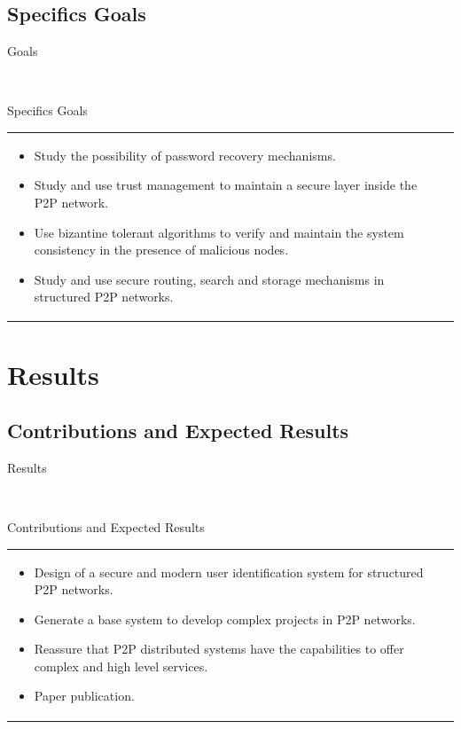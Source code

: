 \documentclass[12pt]{beamer}
\renewcommand{\frametitle}[1]{\vspace{0.2cm}\begin{huge}#1\end{huge}}
\renewcommand{\framesubtitle}[1]{\\ \vspace{0.4cm} \hspace{0.4cm}\begin{large}#1\end{large}}
\begin{document}
  \subsection{Specifics Goals}
    \begin{frame}
    \frametitle{Goals}
    \framesubtitle{Specifics Goals}
    \begin{table}
    \begin{tabular}{p{7cm}p{3cm}}
    \begin{itemize}
      \item Study the possibility of password recovery mechanisms.
      \item Study and use trust management to maintain a
            secure layer inside the P2P network.
      \item Use bizantine tolerant algorithms to verify and maintain the
            system consistency in the presence of malicious nodes.
      \item Study and use secure routing, search and storage mechanisms in
            structured P2P networks.
    \end{itemize}
    &
    \vspace{1.5cm}
    \end{tabular}
    \end{table}
    \end{frame}
  \section{Results}
  \subsection{Contributions and Expected Results}
    \begin{frame}
    \frametitle{Results}
    \framesubtitle{Contributions and Expected Results}
    \begin{table}
    \begin{tabular}{p{7cm}p{3cm}}
      \begin{itemize}
          \item Design of a secure and modern user identification system for
                structured P2P networks.
          \item Generate a base system to develop complex projects in P2P networks.
          \item Reassure that P2P distributed systems have the capabilities to offer
                complex and high level services.
          \item Paper publication.
      \end{itemize}
    &
    \vspace{1.5cm}
    \end{tabular}
    \end{table}
    \end{frame}
\end{document}
